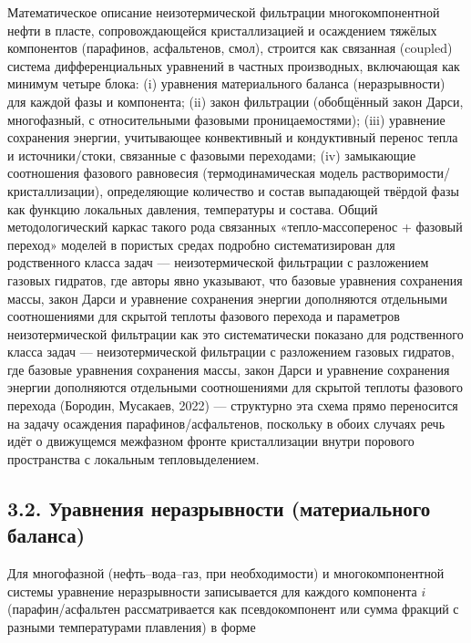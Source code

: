 \documentclass[11pt]{extarticle}
\begin{document}
Математическое описание неизотермической фильтрации многокомпонентной нефти в пласте, сопровождающейся кристаллизацией и осаждением тяжёлых компонентов (парафинов, асфальтенов, смол), строится как связанная (coupled) система дифференциальных уравнений в частных производных, включающая как минимум четыре блока: (i) уравнения материального баланса (неразрывности) для каждой фазы и компонента; (ii) закон фильтрации (обобщённый закон Дарси, многофазный, с относительными фазовыми проницаемостями); (iii) уравнение сохранения энергии, учитывающее конвективный и кондуктивный перенос тепла и источники/стоки, связанные с фазовыми переходами; (iv) замыкающие соотношения фазового равновесия (термодинамическая модель растворимости/кристаллизации), определяющие количество и состав выпадающей твёрдой фазы как функцию локальных давления, температуры и состава. Общий методологический каркас такого рода связанных «тепло-массоперенос + фазовый переход» моделей в пористых средах подробно систематизирован для родственного класса задач --- неизотермической фильтрации с разложением газовых гидратов, где авторы явно указывают, что базовые уравнения сохранения массы, закон Дарси и уравнение сохранения энергии дополняются отдельными соотношениями для скрытой теплоты фазового перехода и параметров неизотермической фильтрации как это систематически показано для родственного класса задач --- неизотермической фильтрации с разложением газовых гидратов, где базовые уравнения сохранения массы, закон Дарси и уравнение сохранения энергии дополняются отдельными соотношениями для скрытой теплоты фазового перехода (Бородин, Мусакаев, 2022) --- структурно эта схема прямо переносится на задачу осаждения парафинов/асфальтенов, поскольку в обоих случаях речь идёт о движущемся межфазном фронте кристаллизации внутри порового пространства с локальным тепловыделением.

\subsection{3.2. Уравнения неразрывности (материального баланса)}\label{ux443ux440ux430ux432ux43dux435ux43dux438ux44f-ux43dux435ux440ux430ux437ux440ux44bux432ux43dux43eux441ux442ux438-ux43cux430ux442ux435ux440ux438ux430ux43bux44cux43dux43eux433ux43e-ux431ux430ux43bux430ux43dux441ux430}

Для многофазной (нефть--вода--газ, при необходимости) и многокомпонентной системы уравнение неразрывности записывается для каждого компонента \(i\) (парафин/асфальтен рассматривается как псевдокомпонент или сумма фракций с разными температурами плавления) в форме
\end{document}

